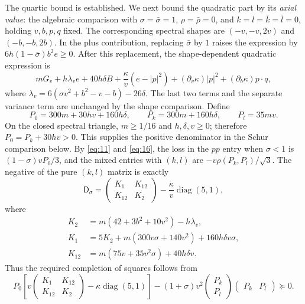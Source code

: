 The quartic bound is established. We next bound the quadratic part by its \emph{axial value}: the algebraic
comparison with $\sigma=\bar\sigma=1$, $\rho=\bar\rho=0$, and
$k=l=\bar k=\bar l=0$, holding $v,b,p,q$ fixed. The corresponding spectral
shapes are $(-v,-v,2v)$ and $(-b,-b,2b)$. In the plus contribution, replacing
$\bar\sigma$ by $1$ raises the expression by
$6h(1-\bar\sigma)b^2e\ge0$. After this replacement, the shape-dependent
quadratic expression is
\[
 mG_v+h\lambda_v e+40h\delta B
 +\frac{\kappa}{v}(e-|p|^2)
 +(\partial_v\kappa)|p|^2+(\partial_b\kappa)p\cdot q,
\]
where $\lambda_v=6(\sigma v^2+b^2-v-b)-26\delta$. The last two terms and
the separate variance term are unchanged by the shape comparison.
Define
\[
 P_0=300m+30hv+160h\delta,\qquad
 P_k=300m+160h\delta,\qquad P_l=35mv.
\]
On the closed spectral triangle, $m\ge1/16$ and $h,\delta,v\ge0$;
therefore $P_0=P_k+30hv>0$. This supplies the positive denominator in
the Schur comparison below.
By \eqref{eq:11} and \eqref{eq:16}, the loss in the $pp$ entry when
$\sigma<1$ is $(1-\sigma)vP_0/3$, and the mixed entries with $(k,l)$
are $-v\rho(P_k,P_l)/\sqrt3$. The negative of the pure $(k,l)$ matrix
is exactly
\[
 \mathsf D_\sigma=
 \begin{pmatrix}K_1&K_{12}\\K_{12}&K_2\end{pmatrix}
       -\frac\kappa v\operatorname{diag}(5,1),
\]
where
\[
\begin{aligned}
 K_2&=m(42+3b^2+10v^2)-h\lambda_v,\\
 K_1&=5K_2+m(300v\sigma+140v^2)+160h\delta v\sigma,\\
 K_{12}&=m(75v+35v^2\sigma)+40h\delta v.
\end{aligned}
\]
Thus the required completion of squares follows from
\begin{equation}
 P_0\left[
 v\begin{pmatrix}K_1&K_{12}\\K_{12}&K_2\end{pmatrix}
       -\kappa\operatorname{diag}(5,1)\right]
 -(1+\sigma)v^2
       \begin{pmatrix}P_k\\P_l\end{pmatrix}
       \begin{pmatrix}P_k&P_l\end{pmatrix}\succeq0.
\tag{21}\label{eq:21}
\end{equation}

